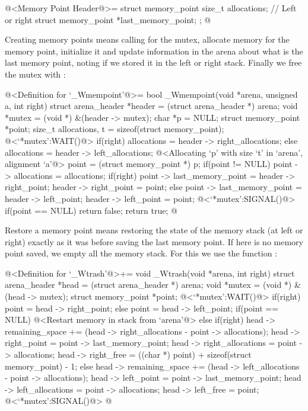 \iniciocodigo
@<Memory Point Header@>=
struct memory_point{
  size_t allocations; // Left or right
  struct memory_point *last_memory_point;
};
@
\fimcodigo


Creating memory points means calling  for the mutex,
allocate memory for the memory point, initialize it and update
information in the arena about what is the last memory point, noting
if we stored it in the left or right stack. Finally we free the mutex
with :

\iniciocodigo
@<Definition for `\_Wmempoint'@>=
bool _Wmempoint(void *arena, unsigned a, int right){
  struct arena_header *header = (struct arena_header *) arena;
  void *mutex = (void *) &(header -> mutex);
  char *p = NULL;
  struct memory_point *point;
  size_t allocations, t = sizeof(struct memory_point);
  @<`*mutex':WAIT()@>
  if(right)
    allocations = header -> right_allocations;
  else
    allocations = header -> left_allocations;
  @<Allocating `p' with size `t' in `arena', alignment `a'@>
  point = (struct memory_point *) p;
  if(point != NULL){
    point -> allocations = allocations;
    if(right){
      point -> last_memory_point = header -> right_point;
      header -> right_point = point;
    }
    else{
      point -> last_memory_point = header -> left_point;
      header -> left_point = point;
    }
  }
  @<`*mutex':SIGNAL()@>
  if(point == NULL)
    return false;
  return true;
}
@
\fimcodigo


Restore a memory point means restoring the state of the memory stack
(at left or right) exactly as it was before saving the last memory
point. If here is no memory point saved, we empty all the memory
stack. For this we use the function :

\iniciocodigo
@<Definition for `\_Wtrash'@>+=
void _Wtrash(void *arena, int right){
  struct arena_header *head = (struct arena_header *) arena;
  void *mutex = (void *) &(head -> mutex);
  struct memory_point *point;
  @<`*mutex':WAIT()@>
  if(right){
    point = head -> right_point;
  }
  else{
    point = head -> left_point;
  }
  if(point == NULL){
    @<Restart memory in stack from `arena'@>
  }
  else{
    if(right){
      head -> remaining_space += (head -> right_allocations -
                                  point -> allocations);
      head -> right_point = point -> last_memory_point;
      head -> right_allocations = point -> allocations;
      head -> right_free = ((char *) point) + sizeof(struct memory_point) - 1;
    }
    else{
      head -> remaining_space += (head -> left_allocations -
                                  point -> allocations);
      head -> left_point = point -> last_memory_point;
      head -> left_allocations = point -> allocations;
      head -> left_free = point;
    }
  }
  @<`*mutex':SIGNAL()@>
}
@
\fimcodigo


